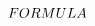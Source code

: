 {$\displaystyle
\special{dvisvgm:bbox new formula}
\special{dvisvgm:raw<!--start {?x} {?y} -->}
    ~FORMULA~
$
}
